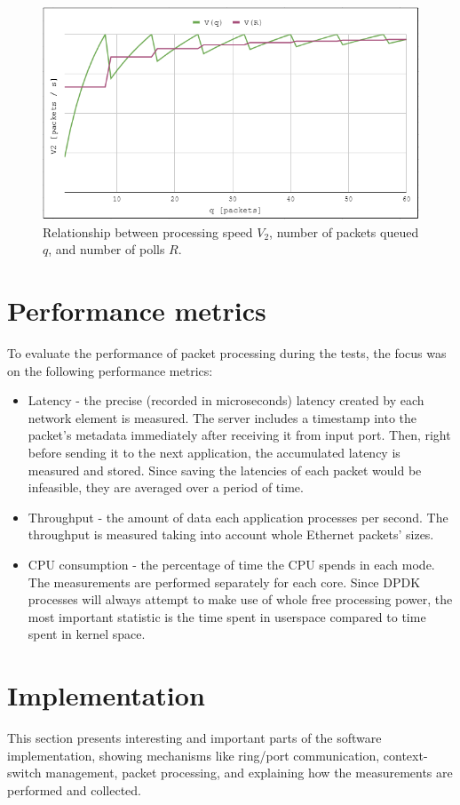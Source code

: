 \documentclass[english]{kththesis}
\begin{document}
\begin{figure}[!ht]
  \centering
    \includegraphics[width=1\textwidth, height=0.5\textwidth]{Fig11}
  \caption{Relationship between processing speed \(V_2\), number of packets queued \(q\), and number of polls \(R\).}
  \label{fig:v2graph}
\end{figure}

\section{Performance metrics}
To evaluate the performance of packet processing during the tests, the focus was on the following performance metrics:

\begin{itemize}
    \item Latency - the precise (recorded in microseconds) latency created by each network element is measured. The server includes a timestamp into the packet's metadata immediately after receiving it from input port. Then, right before sending it to the next application, the accumulated latency is measured and stored. Since saving the latencies of each packet would be infeasible, they are averaged over a period of time.
    \item Throughput - the amount of data each application processes per second. The throughput is measured taking into account whole Ethernet packets' sizes.
    \item CPU consumption - the percentage of time the CPU spends in each mode. The measurements are performed separately for each core. Since DPDK processes will always attempt to make use of whole free processing power, the most important statistic is the time spent in userspace compared to time spent in kernel space.
\end{itemize}

\section{Implementation}
This section presents interesting and important parts of the software implementation, showing mechanisms like ring/port communication, context-switch management, packet processing, and explaining how the measurements are performed and collected.
\end{document}
